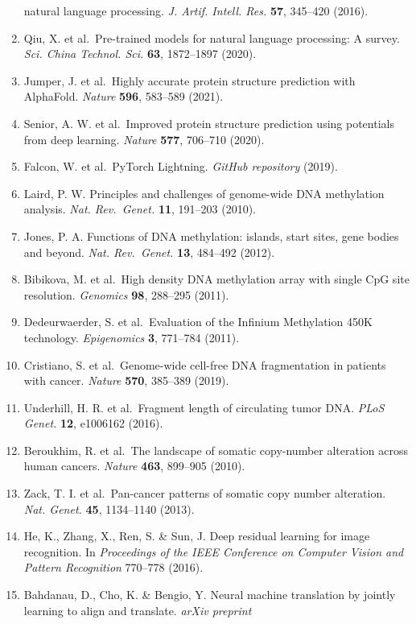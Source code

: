 \begin{enumerate}
  natural language processing. \emph{J. Artif. Intell. Res.}
  \textbf{57}, 345--420 (2016).
\item
  Qiu, X. et al.~Pre-trained models for natural language processing: A
  survey. \emph{Sci. China Technol. Sci.} \textbf{63}, 1872--1897
  (2020).
\item
  Jumper, J. et al.~Highly accurate protein structure prediction with
  AlphaFold. \emph{Nature} \textbf{596}, 583--589 (2021).
\item
  Senior, A. W. et al.~Improved protein structure prediction using
  potentials from deep learning. \emph{Nature} \textbf{577}, 706--710
  (2020).
\item
  Falcon, W. et al.~PyTorch Lightning. \emph{GitHub repository} (2019).
\item
  Laird, P. W. Principles and challenges of genome-wide DNA methylation
  analysis. \emph{Nat. Rev.~Genet.} \textbf{11}, 191--203 (2010).
\item
  Jones, P. A. Functions of DNA methylation: islands, start sites, gene
  bodies and beyond. \emph{Nat. Rev.~Genet.} \textbf{13}, 484--492
  (2012).
\item
  Bibikova, M. et al.~High density DNA methylation array with single CpG
  site resolution. \emph{Genomics} \textbf{98}, 288--295 (2011).
\item
  Dedeurwaerder, S. et al.~Evaluation of the Infinium Methylation 450K
  technology. \emph{Epigenomics} \textbf{3}, 771--784 (2011).
\item
  Cristiano, S. et al.~Genome-wide cell-free DNA fragmentation in
  patients with cancer. \emph{Nature} \textbf{570}, 385--389 (2019).
\item
  Underhill, H. R. et al.~Fragment length of circulating tumor DNA.
  \emph{PLoS Genet.} \textbf{12}, e1006162 (2016).
\item
  Beroukhim, R. et al.~The landscape of somatic copy-number alteration
  across human cancers. \emph{Nature} \textbf{463}, 899--905 (2010).
\item
  Zack, T. I. et al.~Pan-cancer patterns of somatic copy number
  alteration. \emph{Nat. Genet.} \textbf{45}, 1134--1140 (2013).
\item
  He, K., Zhang, X., Ren, S. \& Sun, J. Deep residual learning for image
  recognition. In \emph{Proceedings of the IEEE Conference on Computer
  Vision and Pattern Recognition} 770--778 (2016).
\item
  Bahdanau, D., Cho, K. \& Bengio, Y. Neural machine translation by
  jointly learning to align and translate. \emph{arXiv preprint
}
\end{enumerate}
